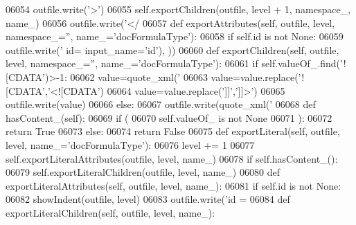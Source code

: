 \begin{DoxyCode}
{{{{{{{{{{{{{{{{{{{{{{{{{{{{{{{{{{{{{{{{{{{{{{{{{{{{{{{{{{{{{{{{{{{{{{{{{{{{{{{{{{{{{{{{{{{{{{{{{{{{{{{{{{{{{{{{{{{{{{{{{{{{{{{{{{{{{{{{{{{{{{{{{{{{{{{{{{{{{{{{{{{{{{{{{{{{{{{{{{{{{{{{{{{{{{{{{{{{{{{{{{{{{{{{{{{{{{{{{{{{{{{{{{{{{{{{{{{{{{{{{{{{{{{{{{{{{{{{{{{{{{{{{{{{{{{{{{{{{{{{{{{{{{{{{{{{{{{{{{{{{{{{{{{{{{{{{{{{{{{{{{{{{{{{{{{{{{{{{{{{{{{{{{{{{{{{{{{{{{{{{{{{{{{{{{{{{{{{06054         outfile.write(\textcolor{stringliteral}{'>'})
06055         self.exportChildren(outfile, level + 1, namespace\_, name\_)
06056         outfile.write(\textcolor{stringliteral}{'</%
06057     \textcolor{keyword}{def }exportAttributes(self, outfile, level, namespace\_='', name\_='docFormulaType'):
06058         \textcolor{keywordflow}{if} self.id \textcolor{keywordflow}{is} \textcolor{keywordflow}{not} \textcolor{keywordtype}{None}:
06059             outfile.write(\textcolor{stringliteral}{' id=%
      input\_name=\textcolor{stringliteral}{'id'}), ))
06060     \textcolor{keyword}{def }exportChildren(self, outfile, level, namespace\_='', name\_='docFormulaType'):
06061         \textcolor{keywordflow}{if} self.valueOf\_.find(\textcolor{stringliteral}{'![CDATA'})>-1:
06062             value=quote_xml(\textcolor{stringliteral}{'%
06063             value=value.replace(\textcolor{stringliteral}{'![CDATA'},\textcolor{stringliteral}{'<![CDATA'})
06064             value=value.replace(\textcolor{stringliteral}{']]'},\textcolor{stringliteral}{']]>'})
06065             outfile.write(value)
06066         \textcolor{keywordflow}{else}:
06067             outfile.write(quote_xml(\textcolor{stringliteral}{'%
06068     \textcolor{keyword}{def }hasContent_(self):
06069         \textcolor{keywordflow}{if} (
06070             self.valueOf_ \textcolor{keywordflow}{is} \textcolor{keywordflow}{not} \textcolor{keywordtype}{None}
06071             ):
06072             \textcolor{keywordflow}{return} \textcolor{keyword}{True}
06073         \textcolor{keywordflow}{else}:
06074             \textcolor{keywordflow}{return} \textcolor{keyword}{False}
06075     \textcolor{keyword}{def }exportLiteral(self, outfile, level, name\_='docFormulaType'):
06076         level += 1
06077         self.exportLiteralAttributes(outfile, level, name\_)
06078         \textcolor{keywordflow}{if} self.hasContent_():
06079             self.exportLiteralChildren(outfile, level, name\_)
06080     \textcolor{keyword}{def }exportLiteralAttributes(self, outfile, level, name\_):
06081         \textcolor{keywordflow}{if} self.id \textcolor{keywordflow}{is} \textcolor{keywordflow}{not} \textcolor{keywordtype}{None}:
06082             showIndent(outfile, level)
06083             outfile.write(\textcolor{stringliteral}{'id = %
06084     \textcolor{keyword}{def }exportLiteralChildren(self, outfile, level, name\_):
}}}}}}}}}}}}}}}}}}}}}}}}}}}}}}}}}}}}}}}}}}}}}}}}}}}}}}}}}}}}}}}}}}}}}}}}}}}}}}}}}}}}}}}}}}}}}}}}}}}}}}}}}}}}}}}}}}}}}}}}}}}}}}}}}}}}}}}}}}}}}}}}}}}}}}}}}}}}}}}}}}}}}}}}}}}}}}}}}}}}}}}}}}}}}}}}}}}}}}}}}}}}}}}}}}}}}}}}}}}}}}}}}}}}}}}}}}}}}}}}}}}}}}}}}}}}}}}}}}}}}}}}}}}}}}}}}}}}}}}}}}}}}}}}}}}}}}}}}}}}}}}}}}}}}}}}}}}}}}}}}}}}}}}}}}}}}}}}}}}}}}}}}}}}}}}}}}}}}}}}}}}}}}}}}}}}}}}}}}}}}
\end{DoxyCode}
